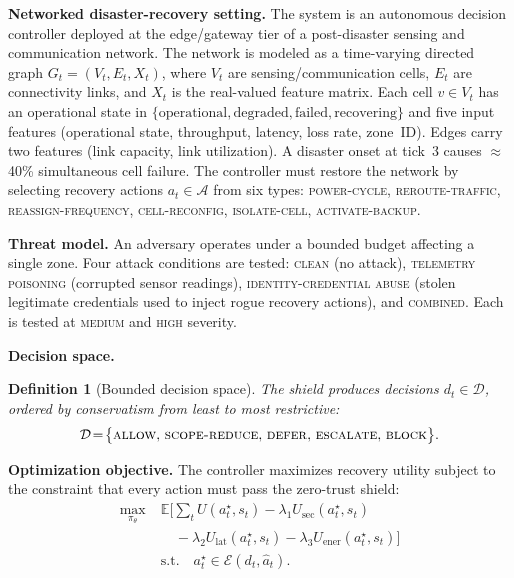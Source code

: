 \documentclass[lettersize,journal]{IEEEtran}
\newtheorem{definition}{Definition}
\begin{document}
\noindent\textbf{Networked disaster-recovery setting.}
The system is an autonomous decision controller deployed at the edge/gateway tier of a post-disaster sensing and communication network.
The network is modeled as a time-varying directed graph $G_t=(V_t, E_t, X_t)$, where $V_t$ are sensing/communication cells, $E_t$ are connectivity links, and $X_t$ is the real-valued feature matrix.
Each cell $v \in V_t$ has an operational state in $\{\text{operational}, \text{degraded}, \text{failed}, \text{recovering}\}$ and five input features (operational state, throughput, latency, loss rate, zone~ID).
Edges carry two features (link capacity, link utilization).
A disaster onset at tick~3 causes $\approx$40\% simultaneous cell failure.
The controller must restore the network by selecting recovery actions $a_t \in \mathcal{A}$ from six types: \textsc{power-cycle}, \textsc{reroute-traffic}, \textsc{reassign-frequency}, \textsc{cell-reconfig}, \textsc{isolate-cell}, \textsc{activate-backup}.

\noindent\textbf{Threat model.}
An adversary operates under a bounded budget affecting a single zone.
Four attack conditions are tested: \textsc{clean} (no attack), \textsc{telemetry poisoning} (corrupted sensor readings), \textsc{identity-credential abuse} (stolen legitimate credentials used to inject rogue recovery actions), and \textsc{combined}.
Each is tested at \textsc{medium} and \textsc{high} severity.

\noindent\textbf{Decision space.}
\begin{definition}[Bounded decision space]
\label{def:enforcement}
The shield produces decisions $d_t \in \mathcal{D}$, ordered by conservatism from least to most restrictive:
\begin{equation*}
\mathcal{D} \!=\! \bigl\{\textnormal{\textsc{allow}},\, \textnormal{\textsc{scope-reduce}},\, \textnormal{\textsc{defer}},\, \textnormal{\textsc{escalate}},\, \textnormal{\textsc{block}}\bigr\}.
\end{equation*}
\end{definition}

\noindent\textbf{Optimization objective.}
The controller maximizes recovery utility subject to the constraint that every action must pass the zero-trust shield:
\begin{align*}
\max_{\pi_\theta}\;&\mathbb{E}\Big[\sum_{t} U(a_t^\star, s_t) - \lambda_1 U_{\mathrm{sec}}(a_t^\star, s_t) \\
&\quad- \lambda_2 U_{\mathrm{lat}}(a_t^\star, s_t) - \lambda_3 U_{\mathrm{ener}}(a_t^\star, s_t)\Big]\\
&\text{s.t.}\quad a_t^\star \in \mathcal{E}(d_t, \hat{a}_t).
\end{align*}
\end{document}
